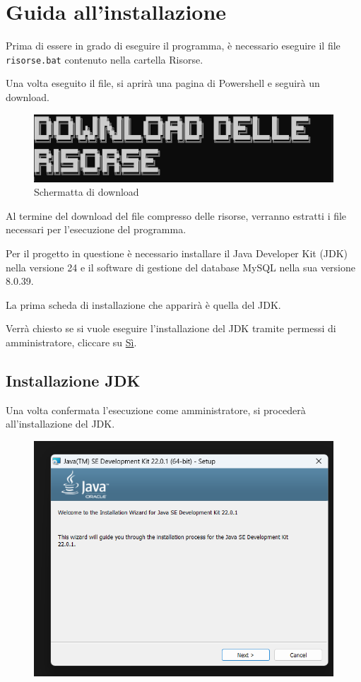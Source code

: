 \section{Guida all'installazione}

Prima di essere in grado di eseguire il programma, è necessario eseguire il file \texttt{risorse.bat} contenuto nella cartella Risorse. 


Una volta eseguito il file, si aprirà una pagina di Powershell e seguirà un download.

\begin{figure}[h!]
    \centering
    \includegraphics[width=.6\textwidth]{images/nuova docs.png}
    \caption{Schermatta di download}
\end{figure}

Al termine del download del file compresso delle risorse, verranno estratti i file necessari per l'esecuzione del programma.



Per il progetto in questione è necessario installare il Java Developer Kit (JDK) nella versione 24 e il software di gestione del database MySQL nella sua versione 8.0.39. 

La prima scheda di installazione che apparirà è quella del JDK. 

Verrà chiesto se si vuole eseguire l'installazione del JDK tramite permessi di amministratore, cliccare su \underline{Sì}.

\subsection{Installazione JDK}

Una volta confermata l'esecuzione come amministratore, si procederà all'installazione del JDK.

\begin{figure}[h!]
    \centering
    \includegraphics[width=.6\textwidth]{images/installazione java.png}
\end{figure}

